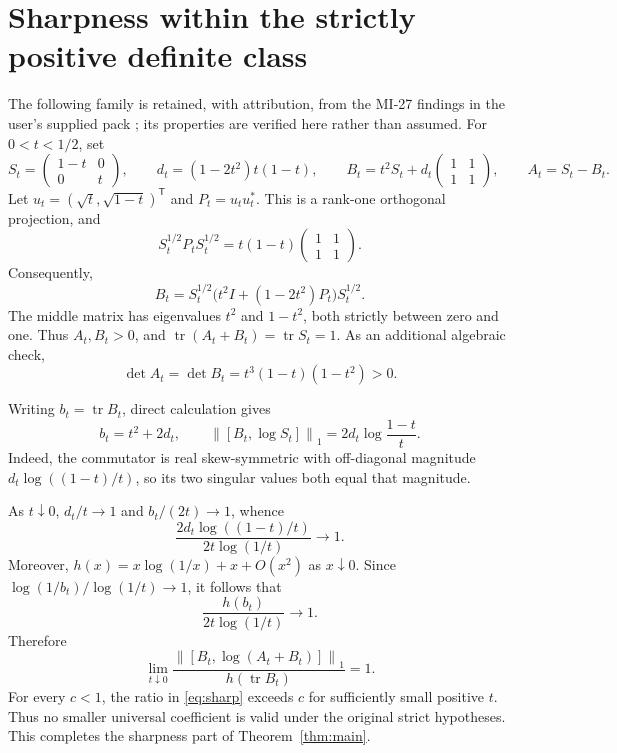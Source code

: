 \documentclass[11pt]{article}
\numberwithin{equation}{section}
\theoremstyle{remark}
\DeclareMathOperator{\tr}{tr}
\newcommand{\Id}{I}
\newcommand{\one}[1]{\left\lVert #1\right\rVert_1}
\begin{document}
\section{Sharpness within the strictly positive definite class}
\label{sec:sharp}

The following family is retained, with attribution, from the MI-27
findings in the user's supplied pack \cite{Pack}; its properties are
verified here rather than assumed.
For $0<t<1/2$, set
\begin{equation}
 S_t=\begin{pmatrix}1-t&0\\0&t\end{pmatrix},\qquad
 d_t=(1-2t^2)t(1-t),\qquad
 B_t=t^2S_t+d_t\begin{pmatrix}1&1\\1&1\end{pmatrix},\qquad
 A_t=S_t-B_t.
 \label{eq:family}
\end{equation}
Let $u_t=(\sqrt t,\sqrt{1-t})^{\mathsf T}$ and $P_t=u_tu_t^*$.
This is a rank-one orthogonal projection, and
\[
 S_t^{1/2}P_tS_t^{1/2}
   =t(1-t)\begin{pmatrix}1&1\\1&1\end{pmatrix}.
\]
Consequently,
\[
 B_t=S_t^{1/2}\bigl(t^2\Id+(1-2t^2)P_t\bigr)S_t^{1/2}.
\]
The middle matrix has eigenvalues $t^2$ and $1-t^2$, both strictly
between zero and one. Thus $A_t,B_t>0$, and
$\tr(A_t+B_t)=\tr S_t=1$. As an additional algebraic check,
\[
 \det A_t=\det B_t=t^3(1-t)(1-t^2)>0.
\]

Writing $b_t=\tr B_t$, direct calculation gives
\begin{equation}
 b_t=t^2+2d_t,\qquad
 \one{[B_t,\log S_t]}=2d_t\log\frac{1-t}{t}.
 \label{eq:family-values}
\end{equation}
Indeed, the commutator is real skew-symmetric with off-diagonal
magnitude $d_t\log((1-t)/t)$, so its two singular values both equal
that magnitude.

As $t\downarrow0$, $d_t/t\to1$ and $b_t/(2t)\to1$, whence
\[
 \frac{2d_t\log((1-t)/t)}{2t\log(1/t)}\longrightarrow1.
\]
Moreover, $h(x)=x\log(1/x)+x+O(x^2)$ as $x\downarrow0$.
Since $\log(1/b_t)/\log(1/t)\to1$, it follows that
\[
 \frac{h(b_t)}{2t\log(1/t)}\longrightarrow1.
\]
Therefore
\begin{equation}
 \boxed{\displaystyle
 \lim_{t\downarrow0}
 \frac{\one{[B_t,\log(A_t+B_t)]}}{h(\tr B_t)}=1.}
 \label{eq:sharp}
\end{equation}
For every $c<1$, the ratio in \eqref{eq:sharp} exceeds $c$ for sufficiently
small positive $t$. Thus no smaller universal coefficient is valid
under the original strict hypotheses. This completes the sharpness
part of Theorem~\ref{thm:main}.
\end{document}
